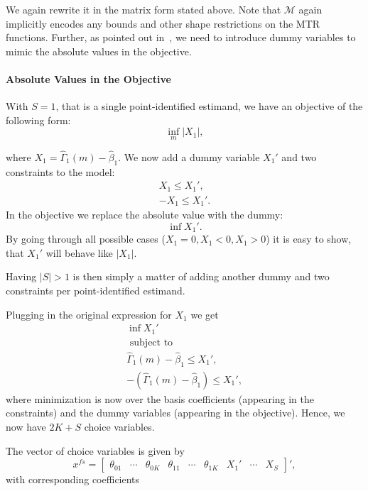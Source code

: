 \documentclass[12pt,a4paper,english]{article} %
\numberwithin{equation}{section}
\theoremstyle{definition}
\theoremstyle{remark}
\theoremstyle{plain}
\begin{document}
We again rewrite it in the matrix form stated above.
Note that $\mathcal{M}$ again implicitly encodes any bounds and other shape restrictions on the MTR functions.
Further, as pointed out in~\cite{mogstad2018using}, we need to introduce dummy variables to mimic the absolute values in the objective.

\paragraph{Absolute Values in the Objective}
With $S = 1$, that is a single point-identified estimand, we have an objective of the following form:
\begin{equation*}
  \inf_m |X_1|,
\end{equation*}

where $X_1 = \hat{\Gamma}_1(m) - \hat{\beta}_1$.
We now add a dummy variable $X_1'$ and two constraints to the model:
\begin{align*}
  X_1 \leq X_1', \\
  -X_1 \leq X_1'.
\end{align*}
In the objective we replace the absolute value with the dummy:
\begin{equation*}
  \inf X_1'.
\end{equation*}
By going through all possible cases ($X_1=0, X_1<0, X_1>0$) it is easy to show,
that $X_1'$ will behave like $|X_1|$.

Having $|S|>1$ is then simply a matter of adding another dummy and two constraints per point-identified estimand.

Plugging in the original expression for $X_1$ we get
\begin{align*}
  \inf X_1' \\
  \text{ subject to }\\
  \hat{\Gamma}_1(m) - \hat{\beta}_1 \leq X_1', \\
  -(\hat{\Gamma}_1(m) - \hat{\beta}_1) \leq X_1',
\end{align*}
where minimization is now over the basis coefficients (appearing in the constraints) and the dummy variables (appearing in the objective).
Hence, we now have $2K + S$ choice variables.

The vector of choice variables is given by
\begin{equation*}
  x^{fs} =
  \begin{bmatrix}
     \theta_{01} & \cdots & \theta_{0K} & \theta_{11} & \cdots & \theta_{1K} & X_1' & \cdots & X_{S}
  \end{bmatrix}',
\end{equation*}
with corresponding coefficients
\end{document}
